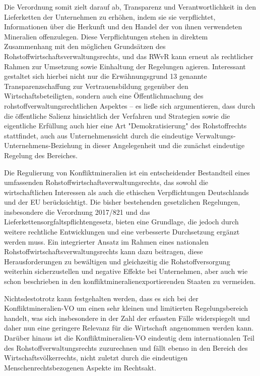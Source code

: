 \documentclass[12pt,a4paper,oneside]{book} %
\begin{document}
{	Die Verordnung somit zielt darauf ab, Transparenz und Verantwortlichkeit in den Lieferketten der Unternehmen zu erhöhen, indem sie sie verpflichtet, Informationen über die Herkunft und den Handel der von ihnen verwendeten Mineralien offenzulegen. Diese Verpflichtungen stehen in direktem Zusammenhang mit den möglichen Grundsätzen des Rohstoffwirtschaftsverwaltungsrechts, und das RWvR kann erneut als rechtlicher Rahmen zur Umsetzung sowie Einhaltung der Regelungen agieren. Interessant gestaltet sich hierbei nicht nur die Erwähnungsgrund 13 genannte Transparenzschaffung zur Vertrauensbildung gegenüber den Wirtschaftsbeteiligten, sondern auch eine Öffentlichmachung des rohstoffverwaltungsrechtlichen Aspektes -- es ließe sich argumentieren, dass durch die öffentliche Salienz hinsichtlich der Verfahren und Strategien sowie die eigentliche Erfüllung auch hier eine Art "Demokratisierung" des Rohstoffrechts stattfindet, auch aus Unternehmenssicht durch die eindeutige Verwaltungs-Unternehmens-Beziehung in dieser Angelegenheit und die zunächst eindeutige Regelung des Bereiches.
	
	Die Regulierung von Konfliktmineralien ist ein entscheidender Bestandteil eines umfassenden Rohstoffwirtschaftsverwaltungsrechts, das sowohl die wirtschaftlichen Interessen als auch die ethischen Verpflichtungen Deutschlands und der EU berücksichtigt. Die bisher bestehenden gesetzlichen Regelungen, insbesondere die Verordnung  2017/821 und das Lieferkettensorgfaltspflichtengesetz, bieten eine Grundlage, die jedoch durch weitere rechtliche Entwicklungen und eine verbesserte Durchsetzung ergänzt werden muss. Ein integrierter Ansatz im Rahmen eines nationalen Rohstoffwirtschaftsverwaltungsrechts kann dazu beitragen, diese Herausforderungen zu bewältigen und gleichzeitig die Rohstoffversorgung weiterhin sicherzustellen und negative Effekte bei Unternehmen, aber auch wie schon beschrieben in den konfliktmineralienexportierenden Staaten zu vermeiden.
	
	Nichtsdestotrotz kann festgehalten werden, dass es sich bei der Konfliktmineralien-VO um einen sehr kleinen und limitierten Regelungsbereich handelt, was sich insbesondere in der Zahl der erfassten Fälle widerspiegelt und daher nun eine geringere Relevanz für die Wirtschaft angenommen werden kann. Darüber hinaus ist die Konfliktmineralien-VO eindeutig dem internationalen Teil des Rohstoffverwaltungsrechts zuzurechnen und fällt ebenso in den Bereich des Wirtschaftsvölkerrechts, nicht zuletzt durch die eindeutigen Menschenrechtsbezogenen Aspekte im Rechtsakt.
	
}
\end{document}
